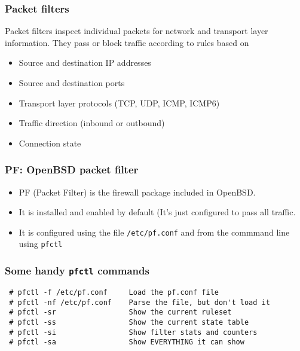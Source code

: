 \documentclass[10pt]{beamer}
\begin{document}
\begin{frame}
  \frametitle{Packet filters}

 Packet filters inspect individual packets for network and transport layer information.  They 
 pass or block traffic according to rules based on

 \begin{itemize}
	 \item Source and destination IP addresses
	 \item Source and destination ports
	 \item Transport layer protocols (TCP, UDP, ICMP, ICMP6)
	 \item Traffic direction (inbound or outbound)
	 \item Connection state
 \end{itemize}

\end{frame}


\begin{frame}
  \frametitle{PF: OpenBSD packet filter}

 \begin{itemize}
   \item PF (Packet Filter) is the firewall package included in OpenBSD.
   \item It is installed and enabled by default (It's just configured to
	   pass all traffic.
   \item It is configured using the file \texttt{/etc/pf.conf} and from the 
	   commmand line using \texttt{pfctl}
 \end{itemize}

\end{frame}



\begin{frame}[fragile]
	\frametitle{Some handy \texttt{pfctl} commands}

 \begin{verbatim}
 # pfctl -f /etc/pf.conf     Load the pf.conf file
 # pfctl -nf /etc/pf.conf    Parse the file, but don't load it
 # pfctl -sr                 Show the current ruleset
 # pfctl -ss                 Show the current state table
 # pfctl -si                 Show filter stats and counters
 # pfctl -sa                 Show EVERYTHING it can show
 \end{verbatim}

\end{frame}
\end{document}
